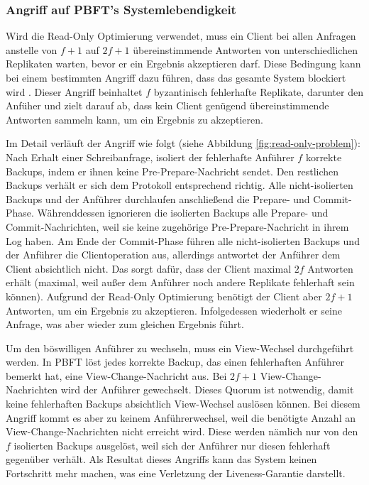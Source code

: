 \documentclass[nonacm,sigconf,natbib=false]{acmart}
\begin{document}
\subsubsection{Angriff auf PBFT's Systemlebendigkeit}

Wird die Read-Only Optimierung verwendet, muss ein Client bei allen Anfragen anstelle von $f+1$ auf $2f+1$ übereinstimmende Antworten von unterschiedlichen Replikaten warten, bevor er ein Ergebnis akzeptieren darf. Diese Bedingung kann bei einem bestimmten Angriff dazu führen, dass das gesamte System blockiert wird \cite{pbft-liveness-problem}. Dieser Angriff beinhaltet $f$ byzantinisch fehlerhafte Replikate, darunter den Anfüher und zielt darauf ab, dass kein Client genügend übereinstimmende Antworten sammeln kann, um ein Ergebnis zu akzeptieren.

Im Detail verläuft der Angriff wie folgt (siehe Abbildung \ref{fig:read-only-problem}): Nach Erhalt einer Schreibanfrage, isoliert der fehlerhafte Anführer $f$ korrekte Backups, indem er ihnen keine Pre-Prepare-Nachricht sendet. Den restlichen Backups verhält er sich dem Protokoll entsprechend richtig. Alle nicht-isolierten Backups und der Anführer durchlaufen anschließend die Prepare- und Commit-Phase. Währenddessen ignorieren die isolierten Backups alle Prepare- und Commit-Nachrichten, weil sie keine zugehörige Pre-Prepare-Nachricht in ihrem Log haben. Am Ende der Commit-Phase führen alle nicht-isolierten Backups und der Anführer die Clientoperation aus, allerdings antwortet der Anführer dem Client absichtlich nicht. Das sorgt dafür, dass der Client maximal $2f$ Antworten erhält (maximal, weil außer dem Anführer noch andere Replikate fehlerhaft sein können). Aufgrund der Read-Only Optimierung benötigt der Client aber $2f+1$ Antworten, um ein Ergebnis zu akzeptieren. Infolgedessen wiederholt er seine Anfrage, was aber wieder zum gleichen Ergebnis führt.

Um den böswilligen Anführer zu wechseln, muss ein View-Wechsel durchgeführt werden. In PBFT löst jedes korrekte Backup, das einen fehlerhaften Anführer bemerkt hat, eine View-Change-Nachricht aus. Bei $2f+1$ View-Change-Nachrichten wird der Anführer gewechselt. Dieses Quorum ist notwendig, damit keine fehlerhaften Backups absichtlich View-Wechsel auslösen können. Bei diesem Angriff kommt es aber zu keinem Anführerwechsel, weil die benötigte Anzahl an View-Change-Nachrichten nicht erreicht wird. Diese werden nämlich nur von den $f$ isolierten Backups ausgelöst, weil sich der Anführer nur diesen fehlerhaft gegenüber verhält. Als Resultat dieses Angriffs kann das System keinen Fortschritt mehr machen, was eine Verletzung der Liveness-Garantie darstellt.
\end{document}
